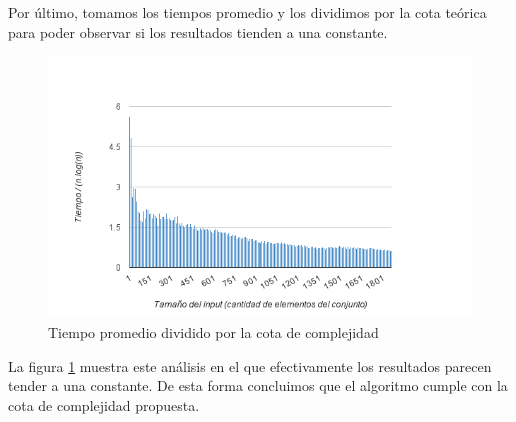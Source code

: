 Por último, tomamos los tiempos promedio y los dividimos por la cota teórica para poder observar si los resultados tienden a una constante.

\begin{figure}[h!]
	\centering
 	\includegraphics[scale=0.8]{imagenes/ej2/cota.png}
	\caption{Tiempo promedio dividido por la cota de complejidad}
	\label{cotalog}
 \end{figure}

La figura \ref{cotalog} muestra este análisis en el que efectivamente los resultados parecen tender a una constante. De esta forma concluimos que el algoritmo cumple con la cota de complejidad propuesta. 